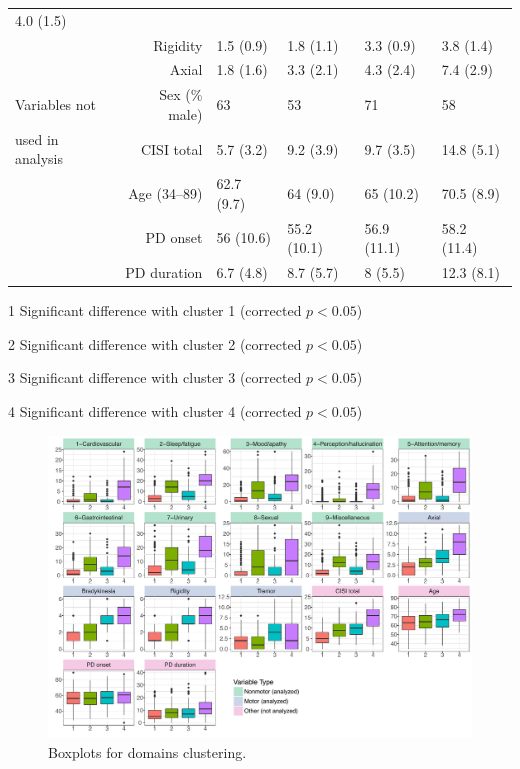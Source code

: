 \documentclass[preprint,5p]{elsarticle} %
\begin{document}
\begin{table}[t]
\begin{threeparttable}
\begin{tabular}{lrllll}
    4.0 (1.5)\tnote{123} \\
    & Rigidity & 1.5 (0.9)\tnote{234} & 1.8 (1.1)\tnote{134} & 3.3 (0.9)\tnote{124} &
    3.8 (1.4)\tnote{123} \\
    & Axial & 1.8 (1.6)\tnote{234} & 3.3 (2.1)\tnote{134} & 4.3 (2.4)\tnote{124} &
    7.4 (2.9)\tnote{123} \\
    \midrule
    Variables not & Sex (\% male) & 63 & 53\tnote{3} & 71\tnote{2} & 58 \\
    used in analysis & CISI total & 5.7 (3.2)\tnote{234} & 9.2 (3.9)\tnote{14} & 9.7
    (3.5)\tnote{14} & 14.8 (5.1)\tnote{123} \\
    & Age (34--89) & 62.7 (9.7)\tnote{34} & 64 (9.0)\tnote{4} & 65 (10.2)\tnote{14} & 70.5 (8.9)\tnote{123} \\
    & PD onset & 56 (10.6) & 55.2 (10.1) & 56.9 (11.1) & 58.2 (11.4) \\
    & PD duration & 6.7 (4.8)\tnote{234} & 8.7 (5.7)\tnote{14} & 8 (5.5)\tnote{14} &
    12.3
    (8.1)\tnote{123} \\
    \bottomrule
  \end{tabular}
  \begin{tablenotes}
    \small
    \item[1] Significant difference with cluster 1 (corrected $p < 0.05$)
    \item[2] Significant difference with cluster 2 (corrected $p < 0.05$)
    \item[3] Significant difference with cluster 3 (corrected $p < 0.05$)
    \item[4] Significant difference with cluster 4 (corrected $p < 0.05$)
  \end{tablenotes}
  \end{threeparttable}
\end{table}

\begin{figure}[b]
  \centering
  \includegraphics[width=\linewidth]{kmeans-summaries-4-pub.pdf}
  \vspace{-7.5em}
  \captionsetup{justification=raggedleft,
    singlelinecheck=false
  }
  \caption{Boxplots for domains clustering.}
  \label{fig:box}
\end{figure}
\end{document}
